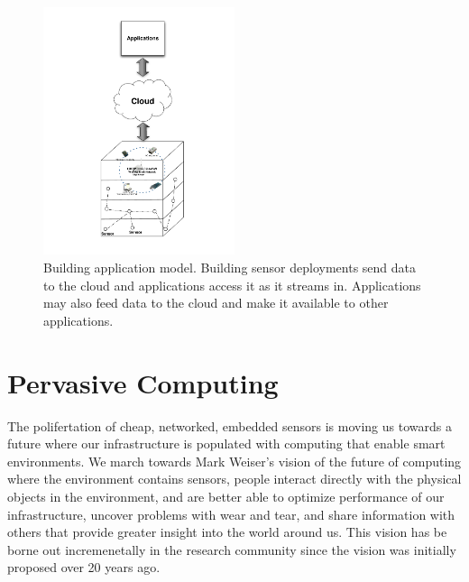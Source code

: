\begin{figure}[h!]
\begin{center}
\includegraphics[width=0.5\textwidth]{figs/BuildingAppModel}
\caption{Building application model.  Building sensor deployments send data to the cloud and applications access it as it streams in.
Applications may also feed data to the cloud and make it available to other applications.}
\label{fig:buidlingapp}
\end{center}
\end{figure}



\section{Pervasive Computing}
The polifertation of cheap, networked, embedded sensors is moving us towards a future where our infrastructure is 
populated with computing that enable smart environments.  We march towards Mark Weiser's vision of the future of
computing \cite{uqicomp_vision} where the environment contains sensors, people interact directly with the 
physical objects in the environment,
and are better able to optimize performance of our infrastructure, uncover problems with wear and tear,
and share information with others that provide greater insight into the world around us.  This vision has be borne out
incremenetally in the research community since the vision was initially proposed over 20 years ago.

